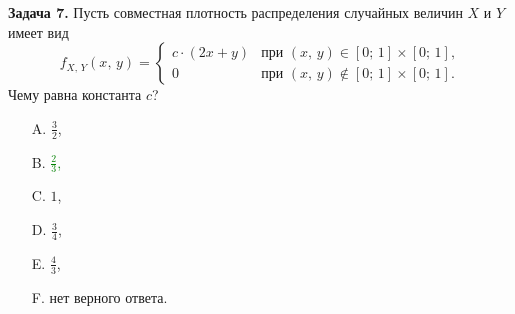 \documentclass[a4paper, 12pt]{article}
\begin{document}
\textbf{Задача 7.} Пусть совместная плотность распределения случайных величин $X$ и $Y$ имеет вид
\[
    f_{X,\,Y}(x,\,y) =
    \left\{
      \begin{array}{ll}
        c \cdot (2x + y) & \text{при $(x,\,y) \in [0;\,1] \times [0;\,1]$,} \\
        0                & \text{при $(x,\,y) \not\in [0;\,1] \times [0;\,1]$.}
      \end{array}
    \right.
\]
Чему равна константа $c$?
\begin{itemize}
  \item[A.] $\frac{3}{2}$,
  \item[B.] \textcolor{green}{$\frac{2}{3}$,}
  \item[C.] $1$,
  \item[D.] $\frac{3}{4}$,
  \item[E.] $\frac{4}{3}$,
  \item[F.] нет верного ответа.
\end{itemize}
\end{document}
